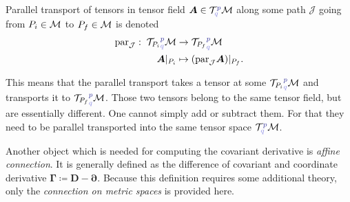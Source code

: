 \begin{definition}
    Parallel transport of tensors in tensor field $\bm A\in \TT^{\bluee p}_{\blueee q} \M$ along some path $\mathcal J$ going from $P_i\in\mathcal{M}$ to $P_f\in\mathcal{M}$ is denoted
    \begin{align*}
        \Par_{\mathcal J}:\; {\TT _{P_i}}^{\bluee p}_{\blueee q}\M&\rightarrow {\TT_{P_f}}^{\bluee p}_{\blueee q}\M\\
        \bm A|_{P_i} &\mapsto (\Par_{\mathcal J} \bm A)|_{P_f}.
    \end{align*}
\end{definition}
This means that the parallel transport takes a tensor at some ${\TT_{P_i}}^{\bluee p}_{\blueee q} \M$ and transports it to ${\TT_{P_f}}^{\bluee p}_{\blueee q} \M$.  Those two tensors belong to the same tensor field, but are essentially different. One cannot simply add or subtract them. For that they need to be parallel transported into the same tensor space $\TT^{\bluee p}_{\blueee q} \M$.


Another object which is needed for computing the covariant derivative is \emph{affine connection}. It is generally defined as the difference of covariant and coordinate derivative
$\bm \Gamma\coloneqq \bm D-\bm\partial$. Because this definition requires some additional theory, only the \emph{connection on metric spaces} is provided here.

